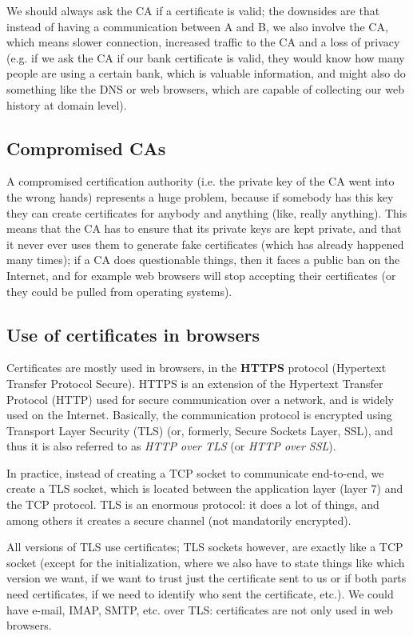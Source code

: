 We should always ask the CA if a certificate is valid; the downsides are that instead of having a communication between A and B, we also involve the CA, which means slower connection, increased traffic to the CA and a loss of privacy (e.g. if we ask the CA if our bank certificate is valid, they would know how many people are using a certain bank, which is valuable information, and might also do something like the DNS or web browsers, which are capable of collecting our web history at domain level).


\subsection{Compromised CAs}
A compromised certification authority (i.e. the private key of the CA went into the wrong hands) represents a huge problem, because if somebody has this key they can create certificates for anybody and anything (like, really anything). This means that the CA has to ensure that its private keys are kept private, and that it never ever uses them to generate fake certificates (which has already happened many times); if a CA does questionable things, then it faces a public ban on the Internet, and for example web browsers will stop accepting their certificates (or they could be pulled from operating systems).


\subsection{Use of certificates in browsers}
Certificates are mostly used in browsers, in the \textbf{HTTPS} protocol (Hypertext Transfer Protocol Secure). HTTPS is an extension of the Hypertext Transfer Protocol (HTTP) used for secure communication over a network, and is widely used on the Internet. Basically, the communication protocol is encrypted using Transport Layer Security (TLS) (or, formerly, Secure Sockets Layer, SSL), and thus it is also referred to as \textit{HTTP over TLS} (or \textit{HTTP over SSL}).

In practice, instead of creating a TCP socket to communicate end-to-end, we create a TLS socket, which is located between the application layer (layer 7) and the TCP protocol. TLS is an enormous protocol: it does a lot of things, and among others it creates a secure channel (not mandatorily encrypted).

All versions of TLS use certificates; TLS sockets however, are exactly like a TCP socket (except for the initialization, where we also have to state things like which version we want, if we want to trust just the certificate sent to us or if both parts need certificates, if we need to identify who sent the certificate, etc.). We could have e-mail, IMAP, SMTP, etc. over TLS: certificates are not only used in web browsers.